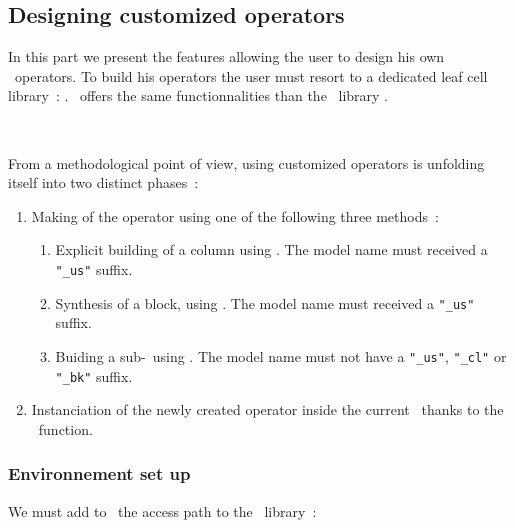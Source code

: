    \subsection{Designing customized operators}
   \begin{minipage}[t]{\textwidth}
     \forceindent
       In this part we present the features allowing the user to design
     his own \datapath\ operators. To build his operators the user must
     resort to a dedicated leaf cell library~: \dplib\footnotemark.
     \dplib\ offers the same functionnalities than the \standartcell\ library
     \sclib.
   \end{minipage}
   \\
   \begin{minipage}[t]{\textwidth}
     \forceindent
       From a methodological point of view, using customized operators is
     unfolding itself into two distinct phases~:
     \begin{enumerate}
       \item
         Making of the operator using one of the following three methods~:
       \begin{enumerate}
         \item
           Explicit building of a column using \genlib. The model name
         must received a {\tt "\_us"} suffix.
         \item
           Synthesis of a block, using \logic. The model name must
         received a {\tt "\_us"} suffix.
         \item
           Buiding a sub-\datapath\ using \fpgen. The model name must not
         have a {\tt "\_us"}, {\tt "\_cl"} or {\tt "\_bk"} suffix.
       \end{enumerate}
       \item
         Instanciation of the newly created operator inside the current
       \datapath\ thanks to the \DPIMPORT\ function.
     \end{enumerate}
   \end{minipage}
     \subsubsection{Environnement set up}
     \doubleindent
       We must add to \mbkcatalib\ the access path to the \dplib\ library~:\\
     \nopagebreak
     \indent
